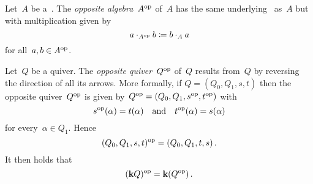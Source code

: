 




\begin{definition}
  Let~$A$ be a~{\kalg}.
  The \emph{opposite algebra}~$A^{\mathrm{op}}$ of~$A$ has the same underlying~{\module{$\kf$}} as~$A$ but with multiplication given by
  \[
              a \cdot_{A^{\mathrm{op}}} b
    \coloneqq  b \cdot_A a
  \]
  for all~$a, b \in A^{\mathrm{op}}$.
\end{definition}


\begin{example}
  Let~$Q$ be a quiver.
  The \emph{opposite quiver}~$Q^{\mathrm{op}}$ of~$Q$ results from~$Q$ by reversing the direction of all its arrows.
  More formally, if $Q = (Q_0, Q_1, s, t)$ then the opposite quiver~$Q^{\mathrm{op}}$ is given by~$Q^{\mathrm{op}} = (Q_0, Q_1, s^{\mathrm{op}}, t^{\mathrm{op}})$ with
  \[
      s^{\mathrm{op}}(\alpha)
    = t(\alpha)
    \quad\text{and}\quad
      t^{\mathrm{op}}(\alpha)
    = s(\alpha)
  \]
  for every~$\alpha \in Q_1$.
  Hence
  \[
    (Q_0, Q_1, s, t)^{\mathrm{op}}
    =
    (Q_0, Q_1, t, s)  \,.
  \]
  It then holds that
  \[
    (\mathbf{k} Q)^{\mathrm{op}} = \mathbf{k} (Q^{\mathrm{op}}) \,.
  \]
\end{example}





